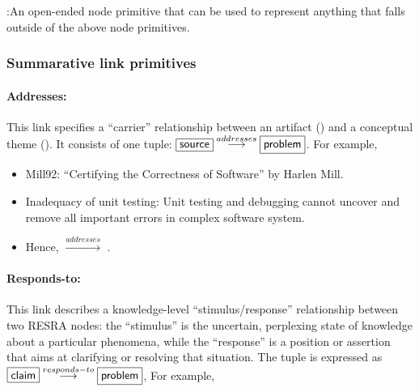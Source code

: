 \noindent{}:\hspace{.2in}An open-ended node primitive that
can be used to represent anything that falls outside of the above node
primitives.


\subsubsection{Summarative link primitives}

\paragraph{Addresses:}

This link specifies a ``carrier'' relationship between an artifact
() and a conceptual theme (). It
consists of one tuple: \( \fbox{{\sf source}}
\stackrel{addresses}{\longrightarrow} \fbox{{\sf problem}} \). For example,

\small{
\begin{itemize}
  
\item {\sf Mill92}: ``Certifying the Correctness of Software'' by Harlen
  Mill.
  
\item {\sf Inadequacy of unit testing}: Unit testing and debugging cannot
  uncover and remove all important errors in complex software system.
  
\item Hence, \hspace{.1in} \(
  \stackrel{addresses}{\longrightarrow} \) .
\end{itemize}
}

\paragraph{Responds-to:}

This link describes a knowledge-level ``stimulus/response'' relationship
between two RESRA nodes: the ``stimulus'' is the uncertain, perplexing state
of knowledge about a particular phenomena, while the ``response'' is a
position or assertion that aims at clarifying or resolving that situation.
The tuple is expressed as \( \fbox{{\sf
claim}}\stackrel{responds-to}{\longrightarrow} \fbox{{\sf problem}} \),  For
example,

